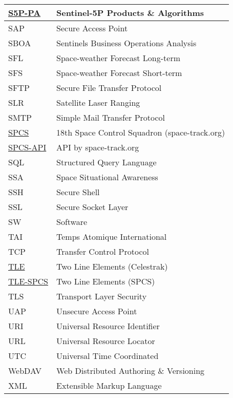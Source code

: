 \documentclass[dec_sum_main.tex]{subfiles}
\begin{document}
\begin{longtable}{|m{2.8cm}|m{10cm}|}
    \href{https://sentinels.copernicus.eu/web/sentinel/technical-guides/sentinel-5p/products-algorithms}{S5P-PA} & Sentinel-5P Products \& Algorithms\\ \hline
    SAP & Secure Access Point \\ \hline
    SBOA & Sentinels Business Operations Analysis \\ \hline
	SFL & Space-weather Forecast Long-term \\ \hline
    SFS & Space-weather Forecast Short-term \\ \hline
    SFTP & Secure File Transfer Protocol \\ \hline
	SLR & Satellite Laser Ranging \\ \hline
	SMTP & Simple Mail Transfer Protocol \\ \hline
	\href{https://www.space-track.org/}{SPCS} & 18th Space Control Squadron (space-track.org) \\ \hline
	\href{https://www.space-track.org/documentation#/api}{SPCS-API} & API by space-track.org \\ \hline
	SQL & Structured Query Language \\ \hline
	SSA & Space Situational Awareness \\ \hline
	SSH & Secure Shell \\ \hline
	SSL & Secure Socket Layer \\ \hline
	SW & Software \\ \hline
	TAI & Temps Atomique International \\ \hline
	TCP & Transfer Control Protocol \\ \hline
    \href{https://www.celestrak.com/NORAD/documentation/tle-fmt.php}{TLE} & Two Line Elements (Celestrak)\\ \hline    
	\href{https://www.space-track.org/documentation#tle}{TLE-SPCS} & Two Line Elements (SPCS)\\ \hline
	TLS & Transport Layer Security \\ \hline
	UAP & Unsecure Access Point \\ \hline
    URI & Universal Resource Identifier \\ \hline
	URL & Universal Resource Locator \\ \hline
	UTC & Universal Time Coordinated \\ \hline
	WebDAV & Web Distributed Authoring \& Versioning \\ \hline
	XML & Extensible Markup Language \\ \hline						
\end{longtable}
\end{document}
